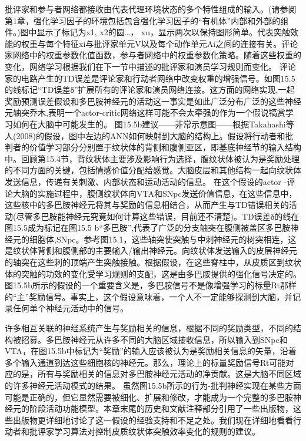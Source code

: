 批评家和参与者网络都接收由代表代理环境状态的多个特性组成的输入。(请参阅第1章，强化学习因子的环境包括包含强化学习因子的“有机体”内部和外部的组件。)图中显示了标记为x1, x2的圆…， xn，显示两次以保持图形简单。代表突触效能的权重与每个特征xi与批评家单元V以及每个动作单元Ai之间的连接有关。评论家网络中的权重参数化值函数，参与者网络中的权重参数化策略。随着这些权重的变化，网络学习根据我们在下一节中描述的批评家和演员学习规则而变化。
评论家的电路产生的TD误差是评论家和行动者网络中改变权重的增强信号。如图15.5的线标记“TD误差δ”扩展所有的评论家和演员网络连接。这方面的网络实现,一起奖励预测误差假设和多巴胺神经元的活动这一事实是如此广泛分布广泛的这些神经元轴突乔木,表明一个actor-critic网络这样可能不会太牵强的作为一个假说犒赏学习如何在大脑中可能发生的。
图15.5b建议——非常示意图——根据Takahashi等人(2008)的假设，图中左边的ANN如何映射到大脑的结构上。假设将行动者和批判者的价值学习部分分别置于纹状体的背侧和腹侧亚区，即基底神经节的输入结构中。回顾第15.4节，背纹状体主要涉及影响行为选择，腹纹状体被认为是奖励处理的不同方面的关键，包括情感价值分配给感觉。大脑皮层和其他结构一起向纹状体发送信息，传递有关刺激、内部状态和运动活动的信息。
在这个假设的actor -评论大脑的实施过程中，腹侧纹状体向VTA和SNpc发送价值信息，在这些信息中，这些核中的多巴胺神经元将其与奖励的信息相结合，从而产生与TD错误相关的活动(尽管多巴胺能神经元究竟如何计算这些错误，目前还不清楚)。TD误差δ的线在图15.5成为标记在图15.5 b“多巴胺”,代表了广泛的分支轴突在腹侧被盖区多巴胺神经元的细胞体,SNpc。参考图15.1，这些轴突使突触与中刺神经元的树突相连，这是纹状体背侧和腹侧部的主要输入/输出神经元。向纹状体发送输入的皮层神经元的轴突在这些刺的顶端产生突触接触。根据假设，在这些脊柱中，从皮质区到纹状体的突触的功效的变化受学习规则的支配，这是由多巴胺提供的强化信号决定的。
图15.5b所示的假设的一个重要含义是，多巴胺信号不是像增强学习的标量Rt那样的“主”奖励信号。事实上，这个假设意味着，一个人不一定能够探测到大脑，并记录任何单个神经元活动中的信号。

许多相互关联的神经系统产生与奖励相关的信息，根据不同的奖励类型，不同的结构被招募。多巴胺神经元从许多不同的大脑区域接收信息，所以输入到SNpc和VTA，在图15.5b中标记为“奖励”的输入应该被认为是奖励相关信息的矢量，沿着多个输入通道到达这些细胞核的神经元。那么，理论上的标量奖励信号Rt可能对应的是，所有与奖励相关的信息对多巴胺神经元活动的净贡献。这是大脑不同区域的许多神经元活动模式的结果。
虽然图15.5b所示的行为-批判神经实现在某些方面可能是正确的，但它显然需要被细化、扩展和修改，才能成为一个完整的多巴胺神经元的阶段活动功能模型。本章末尾的历史和文献注释部分引用了一些出版物，这些出版物更详细地讨论了这一假设的经验支持和不足之处。我们现在详细地看看行动者和批评家学习算法对控制皮质纹状体突触效率变化的规则的建议。

